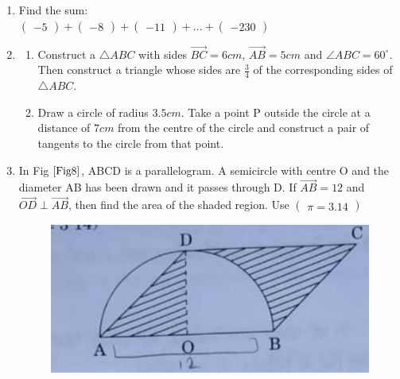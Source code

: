 \documentclass[journal,12pt,twocolumn]{IEEEtran}
\newcommand{\myvec}[1]{\ensuremath{\begin{pmatrix}#1\end{pmatrix}}}
\begin{document}
\begin{enumerate}[label=3.\arabic*]
    \item Find the sum:\\
    $\myvec{-5} + \myvec{-8} + \myvec{-11} + ... + \myvec{-230}$\\
    
    \item 
    \begin{enumerate}
    \item Construct a $\triangle ABC$ with sides $\vec{BC}=6cm$, $\vec{AB} = 5cm$ and $\angle{ABC} = 60^\circ$. Then construct a triangle whose sides are $\frac{3}{4}$ of the corresponding sides of $\triangle ABC$.\\
    
    \item Draw a circle of radius $3.5 cm$. Take a point P outside the circle at a distance of $7 cm$ from the centre of the circle and construct a pair of tangents to the circle from that point. \\
    \end{enumerate}
    
    \item In Fig $\ref{Fig8}$, ABCD is a parallelogram. A semicircle with centre O and the diameter AB has been drawn and it passes through D. If $\Vec{AB} = 12$ and $\Vec{OD} \perp \Vec{AB}$, then find the area of the shaded region. Use $\myvec{\pi = 3.14}$\\
    \begin{figure}[h!]
        \centering
        \includegraphics[width=0.5\columnwidth,center]{Fig8.png}
    	\caption{}
    	\label{Fig8}
     \end{figure} 
\end{enumerate}
\end{document}
